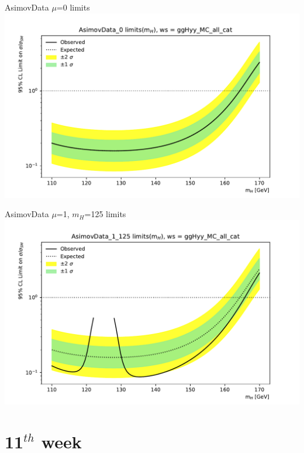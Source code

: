 \documentclass[10pt,UKenglish, leqno, xcolor = dvipsnames]{beamer}
\begin{document}
		\begin{frame}{AsimovData $\mu$=0 limits}
			\vfill
			\includegraphics[width=1.\textwidth]{../images/week_10/plot_AsimovData_0_ggHyy_MC_all_cat.pdf}
			\vfill
		\end{frame}
		
		\begin{frame}{AsimovData $\mu$=1, $m_H$=125 limits}
			\vfill
			\includegraphics[width=1.\textwidth]{../images/week_10/plot_AsimovData_1_125_ggHyy_MC_all_cat.pdf}
			\vfill
		\end{frame}
	
	\section{11$^{th}$ week}
	\SectionPage
	
\end{document}
